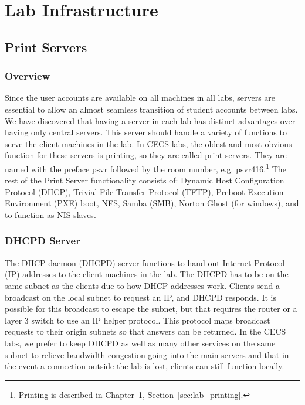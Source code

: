 \chapter{Lab Infrastructure} \label{ch:lab_infrastructure}
\section{Print Servers} \label{sec:printservers}
\subsection{Overview}

Since the user accounts are available on all machines in all labs, servers are essential to allow an almost seamless transition of student accounts between labs.  We have discovered that having a server in each lab has distinct advantages over having only central servers.  This server should handle a variety of functions to serve the client machines in the lab.  In CECS labs, the oldest and most obvious function for these servers is printing, so they are called print servers. They are named with the preface psvr followed by the room number, e.g. psvr416.\footnote{Printing is described in Chapter~\ref{ch:lab_infrastructure}, Section~\ref{sec:lab_printing}.}  The rest of the Print Server functionality consists of: Dynamic Host Configuration Protocol (DHCP), Trivial File Transfer Protocol (TFTP), Preboot Execution Environment (PXE) boot, NFS, Samba (SMB), Norton Ghost (for windows), and to function as NIS slaves.  

\subsection{DHCPD Server}

The DHCP daemon (DHCPD) server functions to hand out Internet Protocol (IP) addresses to the client machines in the lab.  The DHCPD has to be on the same subnet as the clients due to how DHCP addresses work.  Clients send a broadcast on the local subnet to request an IP, and DHCPD responds.  It is possible for this broadcast to escape the subnet, but that requires the router or a layer 3 switch to use an IP helper protocol.  This protocol maps broadcast requests to their origin subnets so that answers can be returned.  In the CECS labs, we prefer to keep DHCPD as well as many other services on the same subnet to relieve bandwidth congestion going into the main servers and that in the event a connection outside the lab is lost, clients can still function locally.  

